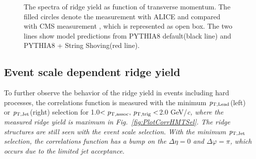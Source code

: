 \begin{figure}[h!]
	\centering
	\caption{ The spectra of ridge yield as function of transverse momentum. The filled circles denote the measurement with ALICE and compared with CMS measurement \cite{ridge_pp_1}, which is represented as open box. The two lines show model predictions from PYTHIA8 default(black line) and PYTHIA8 + String Shoving(red line). }
	\label{fig:PlotYSpect}
\end{figure}

\subsection{Event scale dependent ridge yield}

To further observe the behavior of the ridge yield in events including hard processes, the correlations function is measured with the minimum $\it{p}_{\rm{T, Lead}}$(left) or $\it{p}_{\rm{T, Jet}}$(right) selection for 1.0$<\it{p}_{\rm{T, assoc}},\,\it{p}_{\rm{T, trig}}<$2.0 GeV/\it{c}\rm{}, where the measured ridge yield is maximum in Fig.~\ref{fig:PlotCorrHMTSel}. The ridge structures are still seen with the event scale selection. With the minimum $\it{p}_{\rm{T, Jet}}$ selection, the correlations function has a bump on the $\Delta\eta = 0$ and $\Delta\varphi = \pi$, which occurs due to the limited jet acceptance.

